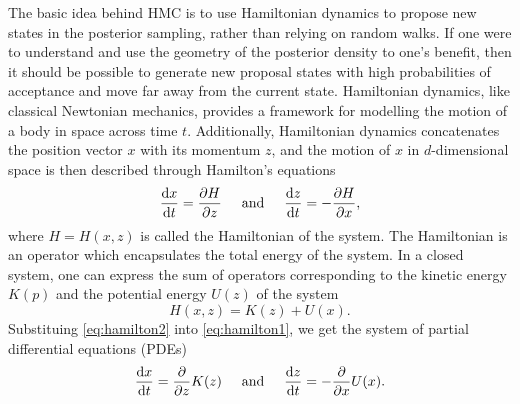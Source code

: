 The basic idea behind HMC is to use Hamiltonian dynamics to propose new states in the posterior sampling, rather than relying on random walks.
If one were to understand and use the geometry of the posterior density to one's benefit, then it should be possible to generate new proposal states with high probabilities of acceptance and move far away from the current state.
Hamiltonian dynamics, like classical Newtonian mechanics, provides a framework for modelling the motion of a body in space across time $t$. 
Additionally, Hamiltonian dynamics concatenates the position vector $x$ with its momentum $z$, and the motion of $x$ in $d$-dimensional space is then described through Hamilton's equations
\begin{equation}\label{eq:hamilton1}
  \frac{\text{d} x}{\text{d} t} = \frac{\partial H}{\partial z}
  \hspace{0.5cm}\text{and}\hspace{0.5cm}
  \frac{\text{d} z}{\text{d} t} = -\frac{\partial H}{\partial x},
\end{equation}
where $H=H(x,z)$ is called the Hamiltonian of the system.
The Hamiltonian is an operator which encapsulates the total energy of the system.
In a closed system, one can express the sum of operators corresponding to the kinetic energy $K(p)$ and the potential energy $U(z)$ of the system
\begin{equation}\label{eq:hamilton2}
  H(x,z) = K(z) + U(x).
\end{equation}
Substituing \cref{eq:hamilton2} into \cref{eq:hamilton1}, we get the system of partial differential equations (PDEs)
\begin{equation}\label{eq:hamilton3}
  \frac{\text{d} x}{\text{d} t} = \frac{\partial}{\partial z} K(z)
  \hspace{0.5cm}\text{and}\hspace{0.5cm}
  \frac{\text{d} z}{\text{d} t} = -\frac{\partial}{\partial x}U(x).
\end{equation}

